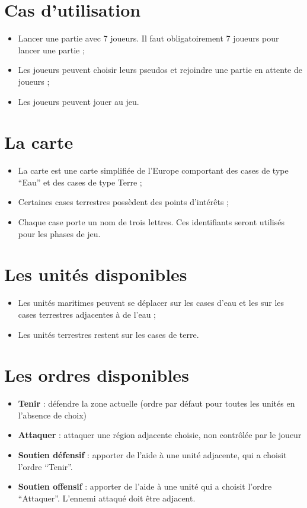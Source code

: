 \section{Cas d'utilisation}
	\begin{itemize}
		\item Lancer une partie avec 7 joueurs. Il faut obligatoirement 7 joueurs pour lancer une partie ;
		\item Les joueurs peuvent choisir leurs pseudos et rejoindre une partie en attente de joueurs ;
		\item Les joueurs peuvent jouer au jeu.
	\end{itemize}

\section{La carte}
	\begin{itemize}
		\item La carte est une carte simplifiée de l'Europe comportant des cases de type \enquote{Eau} et des cases de type Terre ;
		\item Certaines cases terrestres possèdent des points d'intérêts ;
		\item Chaque case porte un nom de trois lettres. Ces identifiants seront utilisés pour les phases de jeu. 
	\end{itemize}

\section{Les unités disponibles}
	\begin{itemize}
		\item Les unités maritimes peuvent se déplacer sur les cases d'eau et les sur les cases terrestres adjacentes à de l'eau ;
		\item Les unités terrestres restent sur les cases de terre.
	\end{itemize}

\section{Les ordres disponibles}
	\begin{itemize}
		\item \textbf{Tenir} : défendre la zone actuelle (ordre par défaut pour toutes les unités en l'absence de choix)
		\item \textbf{Attaquer} : attaquer une région adjacente choisie, non contrôlée par le joueur
		\item \textbf{Soutien défensif} : apporter de l'aide à une unité adjacente, qui a choisit l'ordre \enquote{Tenir}.
		\item \textbf{Soutien offensif} : apporter de l'aide à une unité qui a choisit l'ordre \enquote{Attaquer}. L'ennemi attaqué doit être adjacent.
	\end{itemize}

